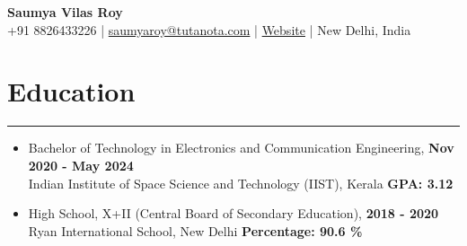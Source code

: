 \documentclass[11pt]{article}
\newlength{\sectionvspace}
\newlength{\sectionvspacee}
\newlength{\sectionvspaceeq}
\begin{document}
	
	\begin{center}
		{\huge\bf Saumya Vilas Roy} \\
		
		\vspace{3mm} %
		{\large
			+91 8826433226 |
			\href{mailto:saumyaroy@tutanota.com}{saumyaroy@tutanota.com} |
			\href{https://caffineaddic.github.io/}{Website} |
			New Delhi, India
		} \\
		{
			
		}
	\end{center}
\begin{comment}
			\vspace{\sectionvspacee}
	\vspace{\sectionvspace}
	\section*{\bf Summary}
	\vspace{\sectionvspace}
	\rule{\textwidth}{0.4pt}
	\begin{itemize}[leftmargin=*,noitemsep,topsep=0pt]
		\item Machine Learning/Deep (ML/DL) Learning researcher with 2.5 years of data analysis experience
		\item Skilled in ML/DL, Electronics, and Communication with an emphasis on biomedical data analysis
		\item Committed to developing innovative solutions in interdisciplinary projects
		\item Interested in ML/DL research opportunities in health and biomedical applications
	\end{itemize}
\end{comment}
	
		\vspace{\sectionvspacee}
	\section*{\bf Education}
	\vspace{\sectionvspace}
	\rule{\textwidth}{0.4pt}
	\begin{itemize}[leftmargin=*,noitemsep,topsep=0pt]
		\item Bachelor of Technology in Electronics and Communication Engineering, \hfill \textbf{Nov 2020 - May 2024} \\
		Indian Institute of Space Science and Technology (IIST), Kerala \hfill \textbf{GPA: 3.12}
		\vspace{\sectionvspaceeq}
		\item High School, X+II (Central Board of Secondary Education), \hfill \textbf{2018 - 2020}\\
		Ryan International School, New Delhi   \hfill \textbf{Percentage: 90.6 \%}
	\end{itemize}
	
\end{document}
